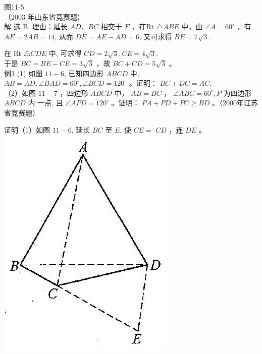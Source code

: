 \documentclass[10pt]{article}
\begin{document}
图11-5\\
（2003 年山东省竞赛题）\\
解 选 B. 理由：延长 $A D 、 B C$ 相交于 $E$ ，在Rt $\triangle A B E$ 中，由 $\angle A=60^{\circ}$ ，有 $A E=2 A B=14$, 从而 $D E=A E-A D=6$, 又可求得 $B E=7 \sqrt{3}$.

在 Rt $\triangle C D E$ 中, 可求得 $C D=2 \sqrt{3}, C E=4 \sqrt{3}$.\\
于是 $B C=B E-C E=3 \sqrt{3}$ ，故 $B C+C D=5 \sqrt{3}$ 。\\
例3 (1) 如图 $11-6$, 已知四边形 $A B C D$ 中, $A B=A D, \angle B A D=60^{\circ}, \angle B C D=120^{\circ}$ 。证明： $B C+D C=A C$.\\
（2）如图 $11-7$ ，四边形 $A B C D$ 中， $A B=B C$ ， $\angle A B C=60^{\circ}, P$ 为四边形 $A B C D$ 内 一点, 且 $\angle A P D=120^{\circ}$ 。证明： $P A+P D+P C \geqslant B D$ 。（2000年江苏省竞赛题）

证明（1）如图 $11-6$, 延长 $B C$ 至 $E$, 使 $C E=$ $C D$ ，连 $D E$ 。\\
\includegraphics[max width=\textwidth, center]{2024_10_30_2c8f45efd4a519b08e1ag-104(1)}
\end{document}

